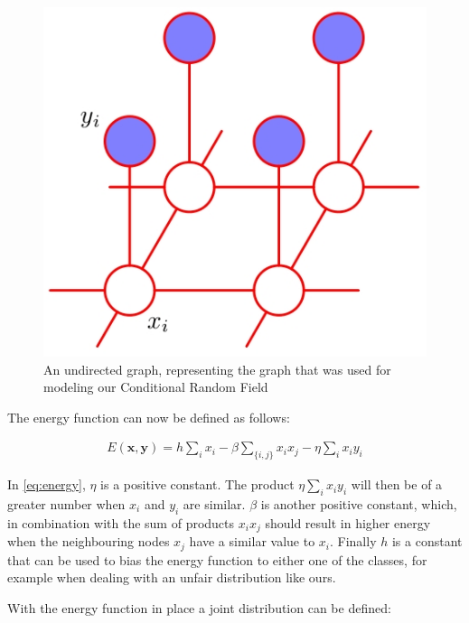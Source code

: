 \begin{figure}
\centering
    \includegraphics[width=\textwidth]{resources/crf}
    \caption{An undirected graph, representing the graph that was used for
    modeling our Conditional Random Field}
    \label{fig:crf}
\end{figure}

The energy function can now be defined as follows\cite{bishop2006pattern}:

\begin{align}
E(\mathbf{x}, \mathbf{y}) = h\sum_i x_i - \beta \sum_{\{i, j\}} x_i x_j
- \eta \sum_i x_i y_i
\label{eq:energy}
\end{align}

In \ref{eq:energy}, $\eta$ is a positive constant. The product $\eta \sum_i
x_i y_i$ will then be of a greater number when $x_i$ and $y_i$ are similar.
$\beta$ is another positive constant, which, in combination with the sum of
products $x_i x_j$ should result in higher energy when the neighbouring nodes
$x_j$ have a similar value to $x_i$. Finally $h$ is a constant that can be used
to bias the energy function to either one of the classes, for example when
dealing with an unfair distribution like ours.

With the energy function in place a joint distribution can be defined:

